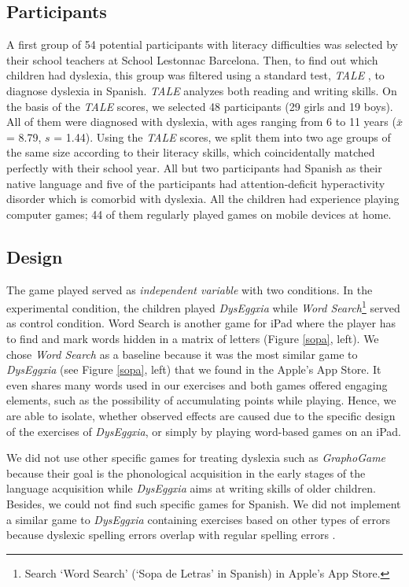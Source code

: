 \documentclass[letterpaper]{sig-alternate-2013}
\begin{document}
\subsection{Participants}
A first group of 54 potential participants with literacy difficulties was selected by their school teachers at School Lestonnac Barcelona. Then, to find out which children had  dyslexia, this group was filtered using a standard test, {\it TALE} \cite{TALE1984}, to diagnose dyslexia in Spanish. {\it TALE} analyzes both reading and writing skills. On the basis of the {\it TALE} scores, we selected 48 participants (29 girls and 19 boys). All of them were diagnosed with dyslexia, with ages ranging from 6 to 11 years ($\bar{x}$= 8.79, $s$ = 1.44).  Using the {\it TALE} scores, we split them into two age groups of the same size according to their literacy skills, which coincidentally matched perfectly with their school year. All but two participants had Spanish as their native language and five of the participants had attention-deficit hyperactivity disorder which is comorbid with dyslexia. All the children had experience playing computer games; 44 of them regularly played games on mobile devices at home.

\subsection{Design}


The game played served as {\it independent variable} with two conditions. In the experimental condition, the children played {\it DysEggxia} while {\it Word Search}\footnote{Search `Word Search' (`Sopa de Letras' in Spanish) in Apple's App Store.}
served as control condition. Word Search is another game for iPad where the player has to find and mark words hidden in a 
matrix of letters (Figure \ref{sopa}, left).  
We chose {\it Word Search} as a baseline because it was the most similar game to {\it DysEggxia} (see Figure \ref{sopa}, left) that we found in the Apple's App Store.  It even shares many words used in our exercises and both games offered engaging elements, such as the
possibility of accumulating points while playing. Hence, we are able to isolate, whether observed effects are caused due to the specific design of the exercises of {\it DysEggxia}, or simply by playing word-based games on an iPad.

We did not use other specific games for treating dyslexia such as {\it GraphoGame} because their goal is the phonological acquisition in the early stages of the language acquisition while {\it DysEggxia} aims at writing skills of older children. Besides, we could not find such specific games for Spanish. We did not implement a similar game to {\it DysEggxia} containing exercises based on other types of errors because dyslexic spelling errors overlap with regular spelling errors \cite{Sterling1998}.
\end{document}
